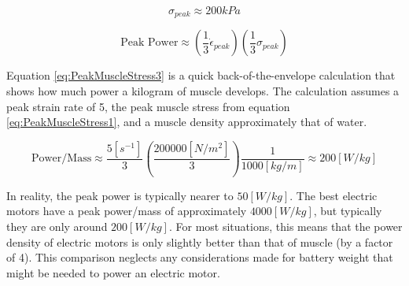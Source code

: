 \begin{equation}
\sigma_{peak} \approx 200 kPa
\label{eq:PeakMuscleStress1}
\end{equation}

\begin{equation}
\mbox{Peak Power} \approx \left(\frac{1}{3} \dot{\epsilon}_{peak}\right)\left(\frac{1}{3} \sigma_{peak}\right)
\label{eq:PeakMuscleStress2}
\end{equation}

Equation \ref{eq:PeakMuscleStress3} is a quick back-of-the-envelope calculation that shows how much power a kilogram of muscle develops. The calculation assumes a peak strain rate of 5, the peak muscle stress from equation \ref{eq:PeakMuscleStress1}, and a muscle density approximately that of water.

\begin{equation}
\mbox{Power/Mass} \approx \frac{5[s^{-1}]}{3}\left(\frac{200000[N/m^2]}{3}\right)\frac{1}{1000[kg/m]} \approx 200 [W/kg]
\label{eq:PeakMuscleStress3}
\end{equation}

In reality, the peak power is typically nearer to $50[W/kg]$. The best electric motors have a peak power/mass of approximately $4000[W/kg]$, but typically they are only around $200[W/kg]$. For most situations, this means that the power density of electric motors is only slightly better than that of muscle (by a factor of 4). This comparison neglects any considerations made for battery weight that might be needed to power an electric motor. 

